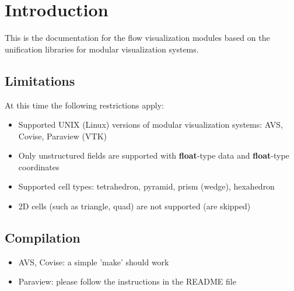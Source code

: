 \chapter{Introduction}
\label{sec:introduction}
This is the documentation for the flow visualization modules based on the unification libraries for modular visualization systems.


\section{Limitations}
\label{sec:limitations}
At this time the following restrictions apply:

\begin{itemize}

\item
  Supported UNIX (Linux) versions of modular visualization systems: AVS, Covise, Paraview (VTK)

\item
  Only unstructured fields are supported with \textbf{float}-type data and \textbf{float}-type coordinates

\item
  Supported cell types: tetrahedron, pyramid, prism (wedge), hexahedron

\item
  2D cells (such as triangle, quad) are not supported (are skipped)


\end{itemize}


\section{Compilation}
\label{sec:compilation}

\begin{itemize}
\item
  AVS, Covise: a simple 'make' should work
\item
  Paraview: please follow the instructions in the README file
\end{itemize}
